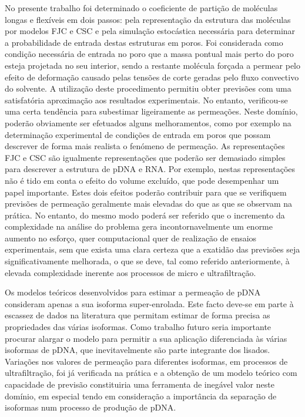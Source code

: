 No presente trabalho foi determinado o coeficiente de partição de moléculas longas e flexíveis em dois passos: pela representação da estrutura das moléculas por modelos FJC e CSC e pela simulação estocástica necessária para determinar a probabilidade de entrada destas estruturas em poros. Foi considerada como condição necessária de entrada no poro que a massa pontual mais perto do poro esteja projetada no seu interior, sendo a restante molécula forçada a permear pelo efeito de deformação causado pelas tensões de corte geradas pelo fluxo convectivo do solvente. A utilização deste procedimento permitiu obter previsões com uma satisfatória aproximação aos resultados experimentais. No entanto, verificou-se uma certa tendência para subestimar ligeiramente as permeações. Neste domínio, poderão obviamente ser efetuados alguns melhoramentos, como por exemplo na determinação experimental de condições de entrada em poros que possam descrever de forma mais realista o fenómeno de permeação. As representações FJC e CSC são igualmente representações que poderão ser demasiado simples para descrever a estrutura de pDNA e RNA. Por exemplo, nestas representações não é tido em conta o efeito do volume excluído, que pode desempenhar um papel importante. Estes dois efeitos poderão contribuir para que se verifiquem previsões de permeação geralmente mais elevadas do que as que se observam na prática. No entanto, do mesmo modo poderá ser referido que o incremento da complexidade na análise do problema gera incontornavelmente um enorme aumento no esforço, quer computacional quer de realização de ensaios experimentais, sem que exista uma clara certeza que a exatidão das previsões seja significativamente melhorada, o que se deve, tal como referido anteriormente, à elevada complexidade inerente aos processos de micro e ultrafiltração.

Os modelos teóricos desenvolvidos para estimar a permeação de pDNA consideram apenas a sua isoforma super-enrolada. Este facto deve-se em parte à escassez de dados na literatura que permitam estimar de forma precisa as propriedades das várias isoformas. Como trabalho futuro seria importante procurar alargar o modelo para permitir a sua aplicação diferenciada às várias isoformas de pDNA, que inevitavelmente são parte integrante dos lisados. Variações nos valores de permeação para diferentes isoformas, em processos de ultrafiltração, foi já verificada na prática \cite{zydneyiso} e a obtenção de um modelo teórico com capacidade de previsão constituiria uma ferramenta de inegável valor neste domínio, em especial tendo em consideração a importância da separação de isoformas num processo de produção de pDNA.

